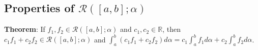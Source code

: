\documentclass[11pt]{article}
\begin{document}
\subsection{Properties of $\mathcal{R}([a,b]; \alpha)$}

\textbf{Theorem}: If $f_1, f_2 \in \mathcal{R}([a,b]; \alpha)$ and $c_1, c_2 \in \mathbb{R}$, then\\
$c_1 f_1 + c_2 f_2 \in \mathcal{R}([a,b]; \alpha)$ and $\int_a^b (c_1 f_1 + c_2 f_2) d\alpha = c_1 \int_a^b f_1 d\alpha + c_2 \int_a^b f_2 d\alpha$.
\end{document}
